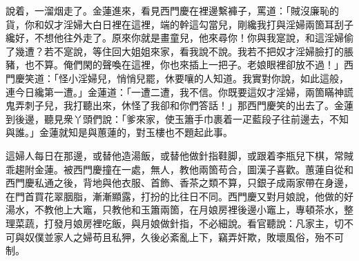 說着，一溜烟走了。金蓮進來，看見西門慶在裡邊繫褲子，罵道：「賊沒廉恥的貨，你和奴才淫婦大白日裡在這裡，端的幹這勾當兒，剛纔我打與淫婦兩箇耳刮子纔好，不想他往外走了。原來你就是畫童兒，他來尋你！你與我寔說，和這淫婦偷了幾遭？若不寔說，等住回大姐姐來家，看我說不說。我若不把奴才淫婦臉打的脹豬，也不算。俺們閑的聲喚在這裡，你也來插上一把子。{}老娘眼裡卻放不過！」西門慶笑道：「怪小淫婦兒，悄悄兒罷，休要嚷的人知道。我實對你說，如此這般，連今日纔第一遭。」金蓮道：「一遭二遭，我不信。你既要這奴才淫婦，兩箇瞞神謊鬼弄刺子兒，我打聽出來，休怪了我卻和你們答話！」那西門慶笑的出去了。金蓮到後邊，聽見衆丫頭們說：「爹來家，使玉簫手巾裹着一疋藍段子往前邊去，不知與誰。」金蓮就知是與蕙蓮的，對玉樓也不題起此事。

這婦人每日在那邊，或替他造湯飯，或替他做針指鞋脚，或跟着李瓶兒下棋，常賊乖趨附金蓮。被西門慶撞在一處，無人，教他兩箇苟合，圖漢子喜歡。蕙蓮自從和西門慶私通之後，背地與他衣服、首飾、香茶之類不算，只銀子成兩家帶在身邊，在門首買花翠胭脂，漸漸顯露，打扮的比往日不同。西門慶又對月娘說，他做的好湯水，不教他上大竈，只教他和玉簫兩箇，在月娘房裡後邊小竈上，專頓茶水，整理菜蔬，打發月娘房裡吃飯，與月娘做針指，不必細說。看官聽說：凡家主，切不可與奴僕並家人之婦苟且私狎，久後必紊亂上下，竊弄奸欺，敗壞風俗，殆不可制。


